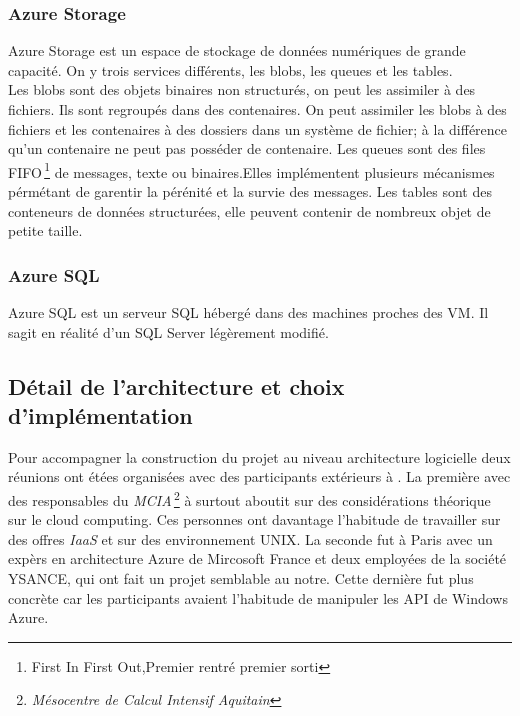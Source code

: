 \subsubsection{Azure Storage}
Azure Storage est un espace de stockage de données numériques de
grande capacité. On y trois services différents, les blobs, les queues et les tables.\\

Les blobs sont des objets binaires non structurés, on peut les
assimiler à des fichiers. Ils sont regroupés dans des contenaires. On
peut assimiler les blobs à des fichiers et les contenaires à des
dossiers dans un système de fichier; à la différence qu'un contenaire
ne peut pas posséder de contenaire. Les queues sont des files
FIFO\,\footnote{{First In First Out},Premier rentré premier sorti} de
messages, texte ou binaires.Elles implémentent plusieurs mécanismes
pérmétant de garentir la pérénité et la survie des messages. Les
tables sont des conteneurs de données structurées, elle peuvent
contenir de nombreux objet de petite taille.\\



\subsubsection{Azure SQL}
Azure SQL est un serveur SQL hébergé dans des machines proches des
VM. Il sagit en réalité d'un SQL Server légèrement modifié.\\
%
%


\subsection{Détail de l'architecture et choix d'implémentation}%
Pour accompagner la construction du projet au niveau architecture
logicielle deux réunions ont étées organisées avec des participants
extérieurs à \maxsea. La première avec des responsables du
\textit{MCIA}\,\footnote{\textit{Mésocentre de Calcul Intensif
    Aquitain}} à surtout aboutit sur des considérations théorique sur
le cloud computing. Ces personnes ont davantage l'habitude de
travailler sur des offres \textit{IaaS} et sur des environnement
UNIX. La seconde fut à Paris avec un expèrs en architecture Azure de
Mircosoft France et deux employées de la société YSANCE, qui ont fait
un projet semblable au notre. Cette dernière fut plus concrète car les
participants avaient l'habitude de manipuler les API de Windows
Azure. \\




